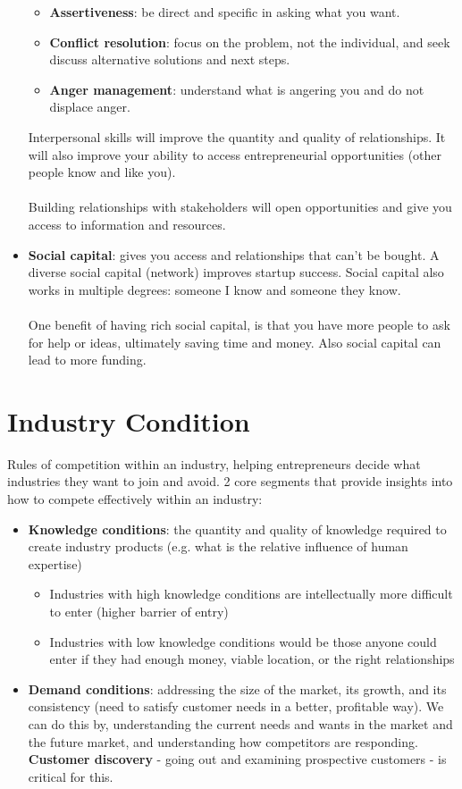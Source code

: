 \documentclass{article}
\begin{document}
\begin{itemize}
\begin{itemize}
        \item \textbf{Assertiveness}: be direct and specific in asking what you want.
        \item \textbf{Conflict resolution}: focus on the problem, not the individual, and seek discuss alternative solutions and next steps.
        \item \textbf{Anger management}: understand what is angering you and do not displace anger.
      \end{itemize}
      Interpersonal skills will improve the quantity and quality of relationships. It will also improve your ability to access entrepreneurial opportunities (other people know and like you). \\ \\
      Building relationships with stakeholders will open opportunities and give you access to information and resources.
    \item \textbf{Social capital}: gives you access and relationships that can't be bought. A diverse social capital (network) improves startup success. Social capital also works in multiple degrees: someone I know and someone they know. \\ \\
      One benefit of having rich social capital, is that you have more people to ask for help or ideas, ultimately saving time and money. Also social capital can lead to more funding.
  \end{itemize}
  \section{Industry Condition}
  Rules of competition within an industry, helping entrepreneurs decide what industries they want to join and avoid. 2 core segments that provide insights into how to compete effectively within an industry:
  \begin{itemize}
    \item \textbf{Knowledge conditions}: the quantity and quality of knowledge required to create industry products (e.g. what is the relative influence of human expertise)
      \begin{itemize}
        \item Industries with high knowledge conditions are intellectually more difficult to enter (higher barrier of entry)
        \item Industries with low knowledge conditions would be those anyone could enter if they had enough money, viable location, or the right relationships
      \end{itemize}
    \item \textbf{Demand conditions}: addressing the size of the market, its growth, and its consistency (need to satisfy customer needs in a better, profitable way). We can do this by, understanding the current needs and wants in the market and the future market, and understanding how competitors are responding. \textbf{Customer discovery} - going out and examining prospective customers - is critical for this.
  \end{itemize}
\end{document}

